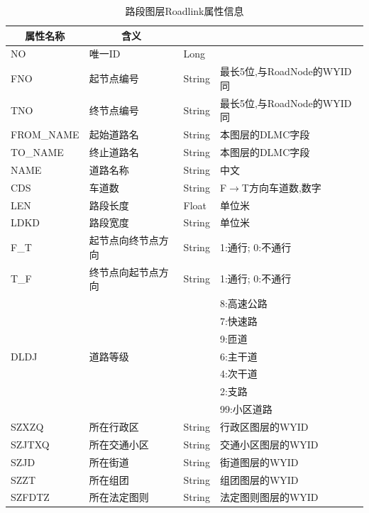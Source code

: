 \renewcommand{\arraystretch}{0.8}
\begin{longtable}[c] {|m{}|m{}|>{\centering\arraybackslash}m{}|
>{\baselineskip=14pt}m{}|} 
\caption{路段图层Roadlink属性信息\label{tbl:路段图层Roadlink属性信息}}
\hline
\multicolumn{1}{|c|}{\bfseries 属性名称} & \multicolumn{1}{c|}{\bfseries 含义} & 
  \multicolumn{1}{c|}{\bfseries 类型} & \multicolumn{1}{c|}{\bfseries 说明}\\\hline

NO & 唯一ID & Long & \\\hline
FNO & 起节点编号 & String & 最长5位,与RoadNode的WYID同 \\\hline
TNO & 终节点编号 & String & 最长5位,与RoadNode的WYID 同 \\\hline
FROM\_NAME & 起始道路名 & String & 本图层的DLMC字段 \\\hline
TO\_NAME & 终止道路名 & String & 本图层的DLMC字段 \\\hline
NAME & 道路名称 & String & 中文 \\\hline
CDS & 车道数 & String & F$\rightarrow$T方向车道数,数字\\\hline
LEN & 路段长度 & Float & 单位米\\\hline
LDKD & 路段宽度 & String & 单位米\\\hline
F\_T & 起节点向终节点方向 & String & 1:通行; 0:不通行\\\hline
T\_F & 终节点向起节点方向 & String & 1:通行; 0:不通行\\\hline
\multirow{7}{*}{DLDJ} & \multirow{7}{*}{道路等级} & \multirow{7}{*}{String} & 8:高速公路\\
& & & 7:快速路 \\
& & & 9:匝道 \\
& & & 6:主干道 \\
& & & 4:次干道 \\
& & & 2:支路 \\
& & & 99:小区道路\\\hline
SZXZQ & 所在行政区 & String & 行政区图层的WYID \\\hline
SZJTXQ & 所在交通小区 & String & 交通小区图层的WYID \\\hline
SZJD & 所在街道 & String & 街道图层的WYID \\\hline
SZZT & 所在组团 & String & 组团图层的WYID \\\hline
SZFDTZ & 所在法定图则 & String & 法定图则图层的WYID \\\hline
\end{longtable}


